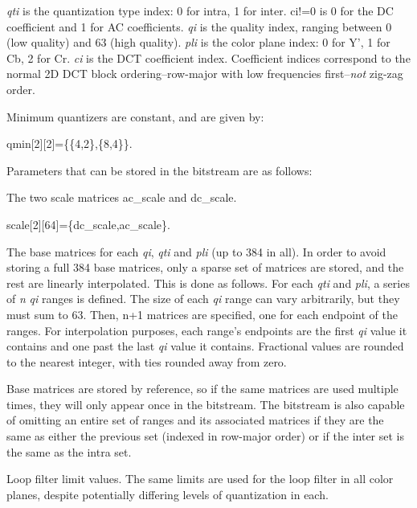{\itshape qti} is the quantization type index\-: 0 for intra, 1 for inter. {\ttfamily ci!=0} is 0 for the D\-C coefficient and 1 for A\-C coefficients. {\itshape qi} is the quality index, ranging between 0 (low quality) and 63 (high quality). {\itshape pli} is the color plane index\-: 0 for Y', 1 for Cb, 2 for Cr. {\itshape ci} is the D\-C\-T coefficient index. Coefficient indices correspond to the normal 2\-D D\-C\-T block ordering--row-\/major with low frequencies first--{\itshape not} zig-\/zag order.

Minimum quantizers are constant, and are given by\-: 
\begin{DoxyCode}
qmin[2][2]=\{\{4,2\},\{8,4\}\}.
\end{DoxyCode}


Parameters that can be stored in the bitstream are as follows\-:
\begin{DoxyItemize}
\item The two scale matrices ac\-\_\-scale and dc\-\_\-scale. 
\begin{DoxyCode}
scale[2][64]=\{dc_scale,ac_scale\}.
\end{DoxyCode}

\item The base matrices for each {\itshape qi}, {\itshape qti} and {\itshape pli} (up to 384 in all). In order to avoid storing a full 384 base matrices, only a sparse set of matrices are stored, and the rest are linearly interpolated. This is done as follows. For each {\itshape qti} and {\itshape pli}, a series of {\itshape n} {\itshape qi} ranges is defined. The size of each {\itshape qi} range can vary arbitrarily, but they must sum to 63. Then, {\ttfamily n+1} matrices are specified, one for each endpoint of the ranges. For interpolation purposes, each range's endpoints are the first {\itshape qi} value it contains and one past the last {\itshape qi} value it contains. Fractional values are rounded to the nearest integer, with ties rounded away from zero.

Base matrices are stored by reference, so if the same matrices are used multiple times, they will only appear once in the bitstream. The bitstream is also capable of omitting an entire set of ranges and its associated matrices if they are the same as either the previous set (indexed in row-\/major order) or if the inter set is the same as the intra set.
\item Loop filter limit values. The same limits are used for the loop filter in all color planes, despite potentially differing levels of quantization in each.
\end{DoxyItemize}


